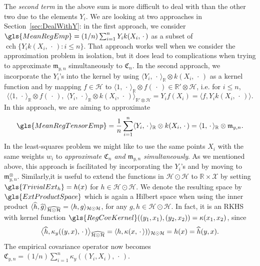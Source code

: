 \documentclass[AHL,Unicode,longabstracts,published]{cedram}
\theoremstyle{remark}
\DeclareMathOperator{\cch}{cch}
\newcommand{\R}{\mathbb{R}}
\newcommand{\dR}{{\R'}}
\newcommand{\X}{\mathcal{X}}
\newcommand{\cH}{\mathcal{H}}
\newcommand{\fkC}{\mathfrak{C}}
\newcommand{\mean}{\mathfrak{m}}
\let\oldhat\hat
\renewcommand*{\hat}[1]{\mathchoice{\widehat{#1}}{\widehat{#1}}{\oldhat{#1}}{\oldhat{#1}}}
\begin{document}
The \emph{second term} in the above sum is more difficult to deal with than the other two due to the elements $Y_i$. We are looking at two approaches in Section~\ref{sec:DealWithY}: in the first approach, we consider $\gls{MeanRegEmp} = (1/n) \sum_{i=1}^n Y_i k(X_i,\,\cdot\,)$ as a subset of $\cch \{Y_i k(X_i,\,\cdot\,) : i \leq n\}$. That approach works well when we consider the approximation problem in isolation, but it does lead to complications when trying to approximate $\mean_{y,n}$ simultaneously to $\fkC_n$. In the second approach, we incorporate the $Y_i$'s into the kernel by using $\langle Y_i, \,\cdot\, \rangle_\R \otimes k(X_i,\,\cdot\,)$ as a kernel function and by mapping $f\in \cH$ to $\langle 1,\,\cdot\, \rangle_\R \otimes f(\,\cdot\,) \in \dR \otimes \cH$, i.e. for $i\leq n$,
\[
\bigl\langle \langle 1,\,\cdot\, \rangle_\R \otimes f(\,\cdot\,),\; \langle Y_i,\,\cdot\, \rangle_\R \otimes k(X_i,\,\cdot\,) \bigr\rangle_{\dR \otimes \cH} = Y_i f(X_i) = \langle f,Y_i k(X_i,\,\cdot\,) \rangle.
\]
In this approach, we are aiming to approximate
\[
\gls{MeanRegTensorEmp} = \frac{1}{n} \sum_{i=1}^n \langle Y_i,\,\cdot\, \rangle_\R \otimes k(X_i,\,\cdot\,) = \langle 1, \,\cdot\, \rangle_\R \otimes \mean_{y,n}.
\]
In the least-squares problem we might like to use the same points $X_i$ with the same weights $w_i$ to
\emph{approximate $\fkC_n$ and $\mean_{y,n}$ simultaneously}. As we mentioned above, this approach is facilitated by incorporating the $Y_i$'s and by moving to $\mean_{y,n}^\otimes$. Similarly,\linebreak it is useful to extend the functions in $\cH \odot \cH$ to $\R \times \X$ by setting $\gls{TrivialExt_h} = h(x)$ for $h\in \cH \odot \cH$. We denote the resulting space by $\gls{ExtProductSpace}$ which is again a Hilbert space when using the inner product $\langle \hat h, \hat g \rangle_{\widehat{\cH \odot \cH}} = \langle h, g \rangle_{\cH \odot \cH}$, for any $g,h \in \cH \odot \cH$. In fact, it is an RKHS with kernel function $\gls{RegCovKernel}((y_1,x_1),(y_2,x_2)) = \kappa(x_1,x_2)$, since
\[
\bigl\langle \hat h, \kappa_y((y,x),\,\cdot\,)
\bigr\rangle_{\widehat{\cH \odot \cH} } = \langle h, \kappa(x, \,\cdot\, \rangle) \rangle_{\cH \odot \cH} = h(x) = \hat h(y,x).
\]
The empirical covariance operator now becomes $\fkC_{y,n} = (1/n) \sum_{i=1}^n \kappa_y((Y_i, X_i), \,\cdot\,)$.
\end{document}
